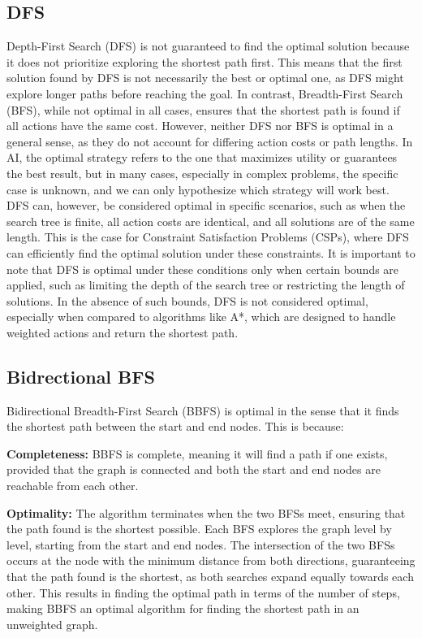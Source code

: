 \documentclass[final, journal, 11pt]{report}
\begin{document}
		\subsection*{DFS}
		Depth-First Search (DFS) is not guaranteed to find the optimal solution because it does not prioritize exploring the shortest path first. This means that the first solution found by DFS is not necessarily the best or optimal one, as DFS might explore longer paths before reaching the goal. In contrast, Breadth-First Search (BFS), while not optimal in all cases, ensures that the shortest path is found if all actions have the same cost. However, neither DFS nor BFS is optimal in a general sense, as they do not account for differing action costs or path lengths. In AI, the optimal strategy refers to the one that maximizes utility or guarantees the best result, but in many cases, especially in complex problems, the specific case is unknown, and we can only hypothesize which strategy will work best. DFS can, however, be considered optimal in specific scenarios, such as when the search tree is finite, all action costs are identical, and all solutions are of the same length. This is the case for Constraint Satisfaction Problems (CSPs), where DFS can efficiently find the optimal solution under these constraints. It is important to note that DFS is optimal under these conditions only when certain bounds are applied, such as limiting the depth of the search tree or restricting the length of solutions. In the absence of such bounds, DFS is not considered optimal, especially when compared to algorithms like A*, which are designed to handle weighted actions and return the shortest path.
		
		\subsection*{Bidrectional BFS}
		Bidirectional Breadth-First Search (BBFS) is optimal in the sense that it finds the shortest path between the start and end nodes. This is because:
		
		\textbf{Completeness:} BBFS is complete, meaning it will find a path if one exists, provided that the graph is connected and both the start and end nodes are reachable from each other. 
		
		\textbf{Optimality:} The algorithm terminates when the two BFSs meet, ensuring that the path found is the shortest possible. Each BFS explores the graph level by level, starting from the start and end nodes. The intersection of the two BFSs occurs at the node with the minimum distance from both directions, guaranteeing that the path found is the shortest, as both searches expand equally towards each other. This results in finding the optimal path in terms of the number of steps, making BBFS an optimal algorithm for finding the shortest path in an unweighted graph.
		
\end{document}
